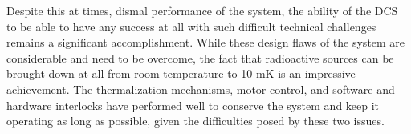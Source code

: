 Despite this at times, dismal performance of the system, the ability of the DCS to be able to have any success at all with such difficult technical challenges remains a significant accomplishment.
While these design flaws of the system are considerable and need to be overcome, the fact that radioactive sources can be brought down at all from room temperature to 10 mK is an impressive achievement.
The thermalization mechanisms, motor control, and software and hardware interlocks have performed well to conserve the system and keep it operating as long as possible, given the difficulties posed by these two issues.